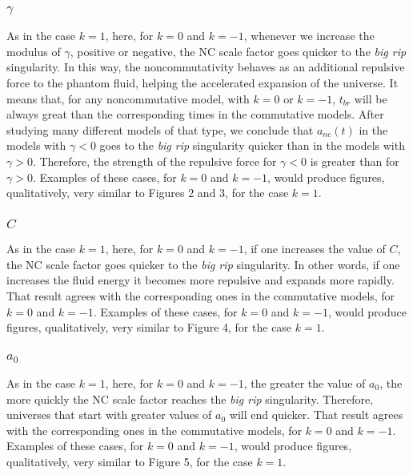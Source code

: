\documentclass[12pt]{article}
\newcommand{\0}{{(0)}}
\newcommand{\1}{{(1)}}
\newcommand{\2}{{(2)}}
\begin{document}
{\subsubsection{$\gamma$}
\label{gamma}

As in the case $k=1$, here, for $k=0$ and $k=-1$, whenever we increase the modulus of $\gamma$, positive or negative, the NC scale factor goes quicker to the {\it big rip} singularity. In this way, the noncommutativity behaves as an additional repulsive force to the phantom fluid, helping the accelerated expansion of the universe.
It means that, for any noncommutative model, with $k=0$ or $k=-1$, $t_{br}$ will be always great than the corresponding times
in the commutative models.
After studying many different models of that type, we conclude that $a_{nc}(t)$ in the models 
with $\gamma < 0$ goes to the {\it big rip} singularity quicker than in the models with $\gamma > 0$. Therefore, the strength of the repulsive force for $\gamma < 0$ is greater than for $\gamma > 0$. Examples of these cases, for $k=0$ and $k=-1$, would produce figures, qualitatively, very similar to Figures 2 and 3, for the case $k=1$.

\subsubsection{$C$}
As in the case $k=1$, here, for $k=0$ and $k=-1$, if one increases the value of $C$, the NC scale factor goes quicker to the {\it big rip} singularity. In other words, if one increases the fluid energy it becomes more repulsive and expands more rapidly. That result agrees with the corresponding ones in the commutative models, for $k=0$ and $k=-1$.
Examples of these cases, for $k=0$ and $k=-1$, would produce figures, qualitatively, very similar to Figure 4, for the case $k=1$.

\subsubsection{$a_0$}
\label{a0}

As in the case $k=1$, here, for $k=0$ and $k=-1$, the greater the value of 
$a_0$, the more quickly the NC scale factor reaches the {\it big rip} singularity. Therefore, universes that start with greater values of $a_0$ will end quicker. That result agrees with the corresponding ones in the commutative models, for $k=0$ and $k=-1$.
Examples of these cases, for $k=0$ and $k=-1$, would produce figures, qualitatively, very similar to Figure 5, for the case $k=1$.

}
\end{document}
